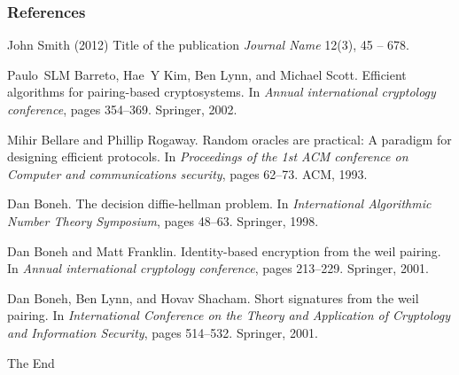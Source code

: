 \documentclass{beamer}
\begin{document}
\begin{frame}
\frametitle{References}
\footnotesize{
\begin{thebibliography}{99} %
 John Smith (2012)
\newblock Title of the publication
\newblock \emph{Journal Name} 12(3), 45 -- 678.


Paulo~SLM Barreto, Hae~Y Kim, Ben Lynn, and Michael Scott.
\newblock Efficient algorithms for pairing-based cryptosystems.
\newblock In {\em Annual international cryptology conference}, pages 354--369.
  Springer, 2002.

Mihir Bellare and Phillip Rogaway.
\newblock Random oracles are practical: A paradigm for designing efficient
  protocols.
\newblock In {\em Proceedings of the 1st ACM conference on Computer and
  communications security}, pages 62--73. ACM, 1993.

Dan Boneh.
\newblock The decision diffie-hellman problem.
\newblock In {\em International Algorithmic Number Theory Symposium}, pages
  48--63. Springer, 1998.

Dan Boneh and Matt Franklin.
\newblock Identity-based encryption from the weil pairing.
\newblock In {\em Annual international cryptology conference}, pages 213--229.
  Springer, 2001.

Dan Boneh, Ben Lynn, and Hovav Shacham.
\newblock Short signatures from the weil pairing.
\newblock In {\em International Conference on the Theory and Application of
  Cryptology and Information Security}, pages 514--532. Springer, 2001.

\end{thebibliography}
}
\end{frame}


\begin{frame}
\Huge{\centerline{The End}}
\end{frame}

\end{document}
